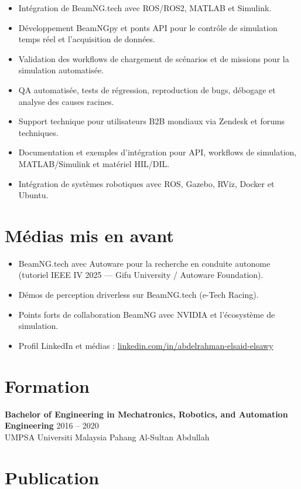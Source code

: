 \documentclass[11pt,a4paper]{article}
\begin{document}
\begin{itemize}
    \item Intégration de BeamNG.tech avec ROS/ROS2, MATLAB et Simulink.
    \item Développement BeamNGpy et ponts API pour le contrôle de simulation temps réel et l'acquisition de données.
    \item Validation des workflows de chargement de scénarios et de missions pour la simulation automatisée.
    \item QA automatisée, tests de régression, reproduction de bugs, débogage et analyse des causes racines.
    \item Support technique pour utilisateurs B2B mondiaux via Zendesk et forums techniques.
    \item Documentation et exemples d'intégration pour API, workflows de simulation, MATLAB/Simulink et matériel HIL/DIL.
    \item Intégration de systèmes robotiques avec ROS, Gazebo, RViz, Docker et Ubuntu.
\end{itemize}

\section*{Médias mis en avant}

\begin{itemize}
    \item BeamNG.tech avec Autoware pour la recherche en conduite autonome (tutoriel IEEE IV 2025 — Gifu University / Autoware Foundation).
    \item Démos de perception driverless sur BeamNG.tech (e-Tech Racing).
    \item Points forts de collaboration BeamNG avec NVIDIA et l'écosystème de simulation.
    \item Profil LinkedIn et médias : \href{https://www.linkedin.com/in/abdelrahman-elsaid-elsawy}{linkedin.com/in/abdelrahman-elsaid-elsawy}
\end{itemize}

\section*{Formation}

\textbf{Bachelor of Engineering in Mechatronics, Robotics, and Automation Engineering}
\hfill 2016 -- 2020\\
UMPSA Universiti Malaysia Pahang Al-Sultan Abdullah

\section*{Publication}
\end{document}
